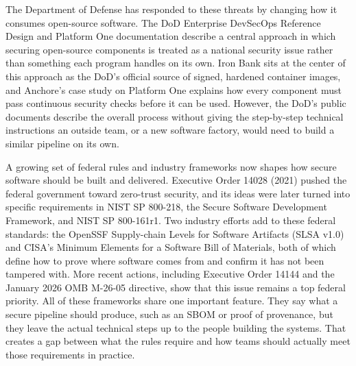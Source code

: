 \documentclass[10pt,letterpaper,twocolumn]{article}
\begin{document}
The Department of Defense has responded to these threats by changing how it consumes open-source software. The DoD Enterprise DevSecOps Reference Design and Platform One documentation describe a central approach in which securing open-source components is treated as a national security issue rather than something each program handles on its own. Iron Bank sits at the center of this approach as the DoD's official source of signed, hardened container images, and Anchore's case study on Platform One explains how every component must pass continuous security checks before it can be used. However, the DoD's public documents describe the overall process without giving the step-by-step technical instructions an outside team, or a new software factory, would need to build a similar pipeline on its own.

A growing set of federal rules and industry frameworks now shapes how secure software should be built and delivered. Executive Order 14028 (2021) pushed the federal government toward zero-trust security, and its ideas were later turned into specific requirements in NIST SP 800-218, the Secure Software Development Framework, and NIST SP 800-161r1. Two industry efforts add to these federal standards: the OpenSSF Supply-chain Levels for Software Artifacts (SLSA v1.0) and CISA's Minimum Elements for a Software Bill of Materials, both of which define how to prove where software comes from and confirm it has not been tampered with. More recent actions, including Executive Order 14144 and the January 2026 OMB M-26-05 directive, show that this issue remains a top federal priority. All of these frameworks share one important feature. They say what a secure pipeline should produce, such as an SBOM or proof of provenance, but they leave the actual technical steps up to the people building the systems. That creates a gap between what the rules require and how teams should actually meet those requirements in practice.
\end{document}
